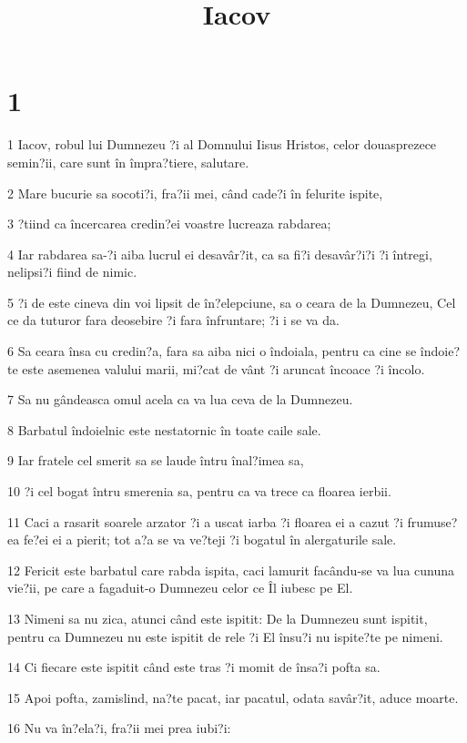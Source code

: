 

\title{Iacov}


\chapter{1}

\par 1 Iacov, robul lui Dumnezeu ?i al Domnului Iisus Hristos, celor douasprezece semin?ii, care sunt în împra?tiere, salutare.
\par 2 Mare bucurie sa socoti?i, fra?ii mei, când cade?i în felurite ispite,
\par 3 ?tiind ca încercarea credin?ei voastre lucreaza rabdarea;
\par 4 Iar rabdarea sa-?i aiba lucrul ei desavâr?it, ca sa fi?i desavâr?i?i ?i întregi, nelipsi?i fiind de nimic.
\par 5 ?i de este cineva din voi lipsit de în?elepciune, sa o ceara de la Dumnezeu, Cel ce da tuturor fara deosebire ?i fara înfruntare; ?i i se va da.
\par 6 Sa ceara însa cu credin?a, fara sa aiba nici o îndoiala, pentru ca cine se îndoie?te este asemenea valului marii, mi?cat de vânt ?i aruncat încoace ?i încolo.
\par 7 Sa nu gândeasca omul acela ca va lua ceva de la Dumnezeu.
\par 8 Barbatul îndoielnic este nestatornic în toate caile sale.
\par 9 Iar fratele cel smerit sa se laude întru înal?imea sa,
\par 10 ?i cel bogat întru smerenia sa, pentru ca va trece ca floarea ierbii.
\par 11 Caci a rasarit soarele arzator ?i a uscat iarba ?i floarea ei a cazut ?i frumuse?ea fe?ei ei a pierit; tot a?a se va ve?teji ?i bogatul în alergaturile sale.
\par 12 Fericit este barbatul care rabda ispita, caci lamurit facându-se va lua cununa vie?ii, pe care a fagaduit-o Dumnezeu celor ce Îl iubesc pe El.
\par 13 Nimeni sa nu zica, atunci când este ispitit: De la Dumnezeu sunt ispitit, pentru ca Dumnezeu nu este ispitit de rele ?i El însu?i nu ispite?te pe nimeni.
\par 14 Ci fiecare este ispitit când este tras ?i momit de însa?i pofta sa.
\par 15 Apoi pofta, zamislind, na?te pacat, iar pacatul, odata savâr?it, aduce moarte.
\par 16 Nu va în?ela?i, fra?ii mei prea iubi?i:

